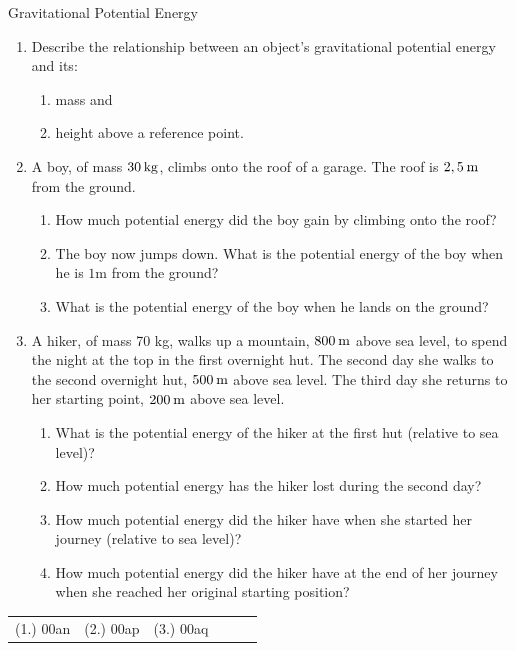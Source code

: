 \begin{exercises}{Gravitational Potential Energy }\noindent\vspace{-1cm}
\begin{enumerate}[noitemsep, label=\textbf{\arabic*}. ] 

\item Describe the relationship between an object's gravitational potential energy and its:
\begin{enumerate}[noitemsep, label=\textbf{\alph*}. ] 
\item mass and
\item height above a reference point.
\end{enumerate}

\item A boy, of mass $30\phantom{\rule{2pt}{0ex}}\text{kg}$, climbs onto the roof of a garage. The roof is $2,5\phantom{\rule{2pt}{0ex}}\text{m}$ from the ground. 
\begin{enumerate}[noitemsep, label=\textbf{\alph*}. ] 
\label{m38784*uid54}\item How much potential energy did the boy gain by climbing onto the roof?
\label{m38784*uid55}\item The boy now jumps down. What is the potential energy of the boy when he is $1 \text{m}$ from the ground?
\label{m38784*uid56}\item What is the potential energy of the boy when he lands on the ground?
\end{enumerate}
                \label{m38784*uid57}\item A hiker, of mass 70 kg, walks up a mountain, $800\phantom{\rule{2pt}{0ex}}\text{m}$ above sea level, to spend the night at the top in the first overnight hut. The second day she walks to the second overnight hut, $500\phantom{\rule{2pt}{0ex}}\text{m}$ above sea level. The third day she returns to her starting point, $200\phantom{\rule{2pt}{0ex}}\text{m}$ above sea level.
\label{m38784*id66702}\begin{enumerate}[noitemsep, label=\textbf{\alph*}. ] 
            \label{m38784*uid58}\item What is the potential energy of the hiker at the first hut (relative to sea level)?
\label{m38784*uid59}\item How much potential energy has the hiker lost during the second day?
\label{m38784*uid60}\item How much potential energy did the hiker have when she started her journey (relative to sea level)?
\label{m38784*uid61}\item How much potential energy did the hiker have at the end of her journey when she reached her original starting position?
\end{enumerate}
                \end{enumerate}
  \label{m38784**end}
\par \practiceinfo
 \par \begin{tabular}[h]{cccccc}
 (1.) 00an  &  (2.) 00ap  &  (3.) 00aq  & \end{tabular}
\end{exercises}


